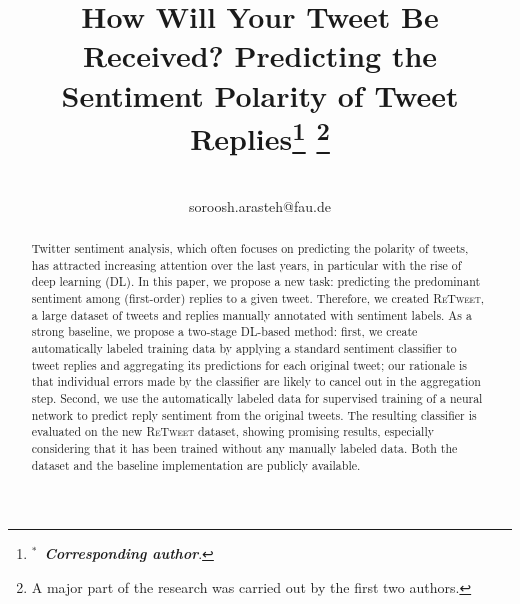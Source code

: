 \documentclass[conference]{IEEEtran}
\newcommand{\retweet}{\textsc{ReTweet}\xspace}
\begin{document}
\title{How Will Your Tweet Be Received? Predicting the Sentiment Polarity of Tweet Replies\thanks{$^{*}$~\textbf{\textit{Corresponding author}}.}
\thanks{A major part of the research was carried out by the first two authors.}}

\author{


\\
soroosh.arasteh@fau.de}




\maketitle



\begin{abstract}
Twitter sentiment analysis, which often focuses on predicting the polarity of tweets, has attracted increasing attention over the last years, in particular with the rise of deep learning (DL).
In this paper, we propose a new task: predicting the predominant sentiment among (first-order) replies to a given tweet. Therefore, we created \retweet, a large dataset of tweets and replies manually annotated with sentiment labels.
As a strong baseline, we propose a two-stage DL-based method:
first, we create automatically labeled training data by applying a standard sentiment classifier to tweet replies and aggregating its predictions for each original tweet; our rationale is that individual errors made by the classifier are likely to cancel out in the aggregation step.
Second, we use the automatically labeled data for supervised training of a neural network to predict reply sentiment from the original tweets. The resulting classifier is evaluated on the new \retweet dataset, showing promising results, especially considering that it has been trained without any manually labeled data.
Both the dataset and the baseline implementation are publicly available.

\end{abstract}
\end{document}
